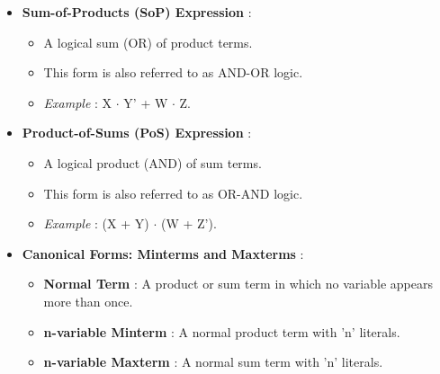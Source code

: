 \documentclass{article}
\begin{document}
\begin{itemize}
\begin{itemize}
\begin{itemize}
        \end{itemize}
    \item \textbf{Sum-of-Products (SoP) Expression} :
    
        \begin{itemize}
            \item A logical sum (OR) of product terms.
            \item This form is also referred to as AND-OR logic.
            \item \textit{Example} : X $\cdot$ Y' + W $\cdot$ Z.
        \end{itemize}
    \item \textbf{Product-of-Sums (PoS) Expression} :
    
        \begin{itemize}
            \item A logical product (AND) of sum terms.
            \item This form is also referred to as OR-AND logic.
            \item \textit{Example} : (X + Y) $\cdot$ (W + Z').
        \end{itemize}
    \item \textbf{Canonical Forms: Minterms and Maxterms} :
    
        \begin{itemize}
            \item \textbf{Normal Term} : A product or sum term in which no variable appears more than once.
            \item \textbf{n-variable Minterm} : A normal product term with 'n' literals.
            
            \item \textbf{n-variable Maxterm} : A normal sum term with 'n' literals.
            

\end{itemize}
\end{itemize}
\end{itemize}
\end{document}
